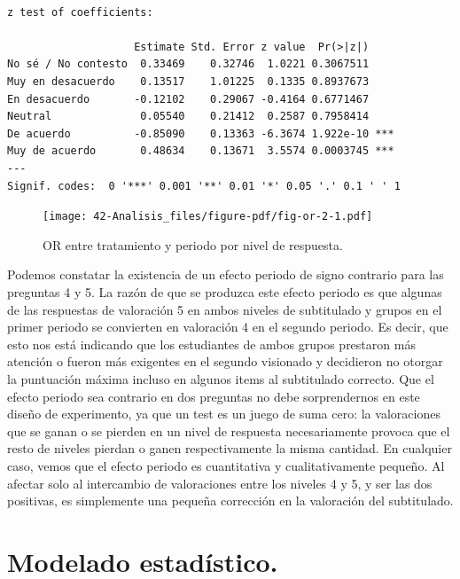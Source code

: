 \documentclass[
  12pt,
  a4paper,
  extrafontsizes,
  onecolumn,
  openright]{memoir}
\begin{document}
\begin{verbatim}

z test of coefficients:

                    Estimate Std. Error z value  Pr(>|z|)    
No sé / No contesto  0.33469    0.32746  1.0221 0.3067511    
Muy en desacuerdo    0.13517    1.01225  0.1335 0.8937673    
En desacuerdo       -0.12102    0.29067 -0.4164 0.6771467    
Neutral              0.05540    0.21412  0.2587 0.7958414    
De acuerdo          -0.85090    0.13363 -6.3674 1.922e-10 ***
Muy de acuerdo       0.48634    0.13671  3.5574 0.0003745 ***
---
Signif. codes:  0 '***' 0.001 '**' 0.01 '*' 0.05 '.' 0.1 ' ' 1
\end{verbatim}

\normalsize

\begin{figure}[h]

{\centering \texttt{[image: 42-Analisis\_files/figure-pdf/fig-or-2-1.pdf]}

}

\caption{\label{fig-or-2}OR entre tratamiento y periodo por nivel de
respuesta.}

\end{figure}

Podemos constatar la existencia de un efecto periodo de signo contrario
para las preguntas 4 y 5. La razón de que se produzca este efecto
periodo es que algunas de las respuestas de valoración 5 en ambos
niveles de subtitulado y grupos en el primer periodo se convierten en
valoración 4 en el segundo periodo. Es decir, que esto nos está
indicando que los estudiantes de ambos grupos prestaron más atención o
fueron más exigentes en el segundo visionado y decidieron no otorgar la
puntuación máxima incluso en algunos items al subtitulado correcto. Que
el efecto periodo sea contrario en dos preguntas no debe sorprendernos
en este diseño de experimento, ya que un test es un juego de suma cero:
la valoraciones que se ganan o se pierden en un nivel de respuesta
necesariamente provoca que el resto de niveles pierdan o ganen
respectivamente la misma cantidad. En cualquier caso, vemos que el
efecto periodo es cuantitativa y cualitativamente pequeño. Al afectar
solo al intercambio de valoraciones entre los niveles 4 y 5, y ser las
dos positivas, es simplemente una pequeña corrección en la valoración
del subtitulado.


\hypertarget{modelado-estaduxedstico.}{%
\chapter{Modelado estadístico.}\label{modelado-estaduxedstico.}}
\end{document}
